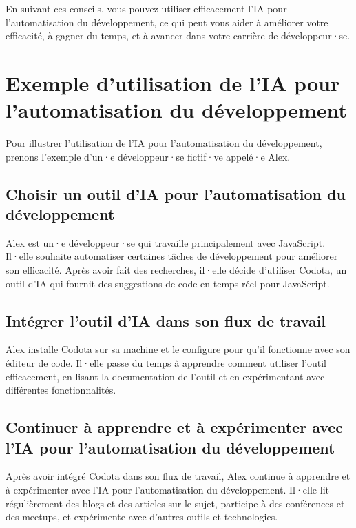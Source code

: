 En suivant ces conseils, vous pouvez utiliser efficacement l'IA pour l'automatisation du développement, ce qui peut vous aider à améliorer votre efficacité, à gagner du temps, et à avancer dans votre carrière de développeur·se.

\section{Exemple d'utilisation de l'IA pour l'automatisation du développement}

Pour illustrer l'utilisation de l'IA pour l'automatisation du développement, prenons l'exemple d'un·e développeur·se fictif·ve appelé·e Alex.

\subsection{Choisir un outil d'IA pour l'automatisation du développement}

Alex est un·e développeur·se qui travaille principalement avec JavaScript. Il·elle souhaite automatiser certaines tâches de développement pour améliorer son efficacité. Après avoir fait des recherches, il·elle décide d'utiliser Codota, un outil d'IA qui fournit des suggestions de code en temps réel pour JavaScript.

\subsection{Intégrer l'outil d'IA dans son flux de travail}

Alex installe Codota sur sa machine et le configure pour qu'il fonctionne avec son éditeur de code. Il·elle passe du temps à apprendre comment utiliser l'outil efficacement, en lisant la documentation de l'outil et en expérimentant avec différentes fonctionnalités.

\subsection{Continuer à apprendre et à expérimenter avec l'IA pour l'automatisation du développement}

Après avoir intégré Codota dans son flux de travail, Alex continue à apprendre et à expérimenter avec l'IA pour l'automatisation du développement. Il·elle lit régulièrement des blogs et des articles sur le sujet, participe à des conférences et des meetups, et expérimente avec d'autres outils et technologies.



